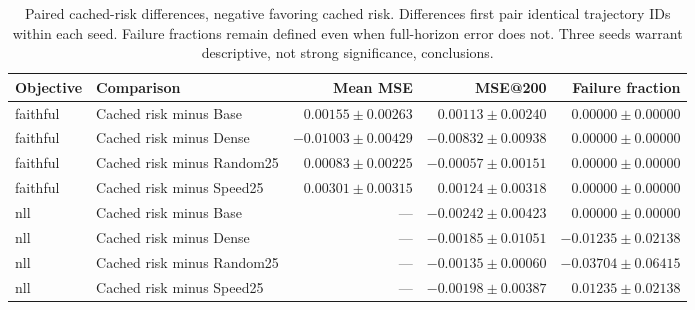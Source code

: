 \begin{table}[t]
\centering\small
\caption{Paired cached-risk differences, negative favoring cached risk. Differences first pair identical trajectory IDs within each seed. Failure fractions remain defined even when full-horizon error does not. Three seeds warrant descriptive, not strong significance, conclusions.}
\label{tab:full-paired}
\begin{tabular}{llrrr}
\toprule
Objective & Comparison & Mean MSE & MSE@200 & Failure fraction\\
\midrule
faithful & Cached risk minus Base & $0.00155\pm0.00263$ & $0.00113\pm0.00240$ & $0.00000\pm0.00000$\\
faithful & Cached risk minus Dense & $-0.01003\pm0.00429$ & $-0.00832\pm0.00938$ & $0.00000\pm0.00000$\\
faithful & Cached risk minus Random25 & $0.00083\pm0.00225$ & $-0.00057\pm0.00151$ & $0.00000\pm0.00000$\\
faithful & Cached risk minus Speed25 & $0.00301\pm0.00315$ & $0.00124\pm0.00318$ & $0.00000\pm0.00000$\\
nll & Cached risk minus Base & --- & $-0.00242\pm0.00423$ & $0.00000\pm0.00000$\\
nll & Cached risk minus Dense & --- & $-0.00185\pm0.01051$ & $-0.01235\pm0.02138$\\
nll & Cached risk minus Random25 & --- & $-0.00135\pm0.00060$ & $-0.03704\pm0.06415$\\
nll & Cached risk minus Speed25 & --- & $-0.00198\pm0.00387$ & $0.01235\pm0.02138$\\
\bottomrule
\end{tabular}
\end{table}



